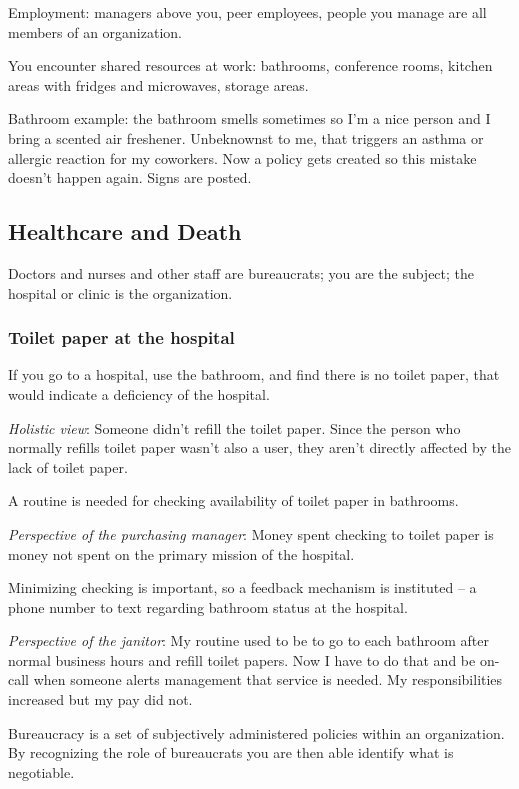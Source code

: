 Employment: managers above you, peer employees, people you manage are all members of an organization. 


You encounter shared resources at work: bathrooms, conference rooms, kitchen areas with fridges and microwaves, storage areas. 

Bathroom example: the bathroom smells sometimes so I'm a nice person and I bring a scented air freshener. Unbeknownst to me, that triggers an asthma or allergic reaction for my coworkers. Now a policy gets created so this mistake doesn't happen again. Signs are posted. 


\subsection*{Healthcare and Death\label{sec:bureaucracy-of-death}}
Doctors and nurses and other staff are bureaucrats; you are the subject; the hospital or clinic is the organization. 


\subsubsection*{Toilet paper at the hospital}

\begin{mdframed}
If you go to a hospital, use the bathroom, and find there is no toilet paper, that would indicate a deficiency of the hospital.

\textit{Holistic view}: Someone didn't refill the toilet paper. Since the person who normally refills toilet paper wasn't also a user, they aren't directly affected by the lack of toilet paper.

A routine is needed for checking availability of toilet paper in bathrooms. 

\textit{Perspective of the purchasing manager}: Money spent checking to toilet paper is money not spent on the primary mission of the hospital.

Minimizing checking is important, so a feedback mechanism is instituted -- a phone number to text regarding bathroom status at the hospital.

\textit{Perspective of the janitor}: My routine used to be to go to each bathroom after normal business hours and refill toilet papers. Now I have to do that and be on-call when someone alerts management that service is needed. My responsibilities increased but my pay did not.

\end{mdframed}






Bureaucracy is a set of subjectively administered policies within an organization. By recognizing the role of bureaucrats you are then able identify what is negotiable. 
